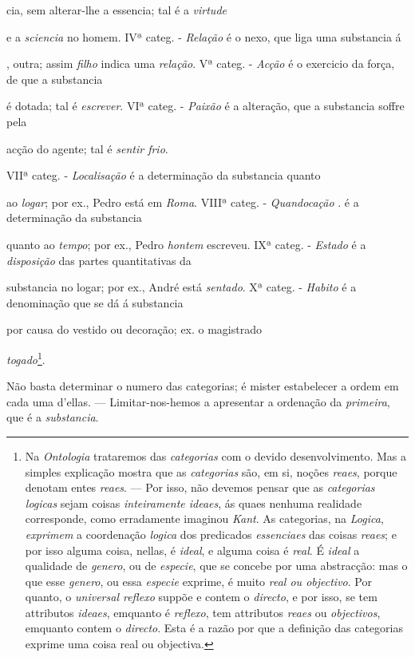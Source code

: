 cia, sem alterar-lhe a essencia; tal é a \emph{virtude}

e a \emph{sciencia} no homem. IVª categ. - \emph{Relação} é o nexo, que liga uma substancia á

, outra; assim \emph{filho} indica uma \emph{relação}. Vª categ. - \emph{Acção} é o exercicio da força, de que a substancia

é dotada; tal é \emph{escrever}. VIª categ. - \emph{Paixão} é a alteração, que a substancia soffre pela

acção do agente; tal é \emph{sentir frio}.

VIIª categ. - \emph{Localisação} é a determinação da substancia quanto

ao \emph{logar}; por ex., Pedro está em \emph{Roma}. VIIIª categ. - \emph{Quandocação} . é a determinação da substancia

quanto ao \emph{tempo}; por ex., Pedro \emph{hontem} escreveu. IXª categ. - \emph{Estado} é a \emph{disposição} das partes quantitativas da

substancia no logar; por ex., André está \emph{sentado}. Xª categ. - \emph{Habito} é a denominação que se dá á substancia

por causa do vestido ou decoração; ex. o magistrado

\emph{togado}\footnote{Na \emph{Ontologia} trataremos das \emph{categorias} com o devido desenvolvimento. Mas a simples explicação mostra que as \emph{categorias} são, em si, noções \emph{reaes}, porque denotam entes \emph{reaes}. --- Por isso, não devemos pensar que as \emph{categorias logicas} sejam coisas \emph{inteiramente ideaes}, ás quaes nenhuma realidade corresponde, como erradamente imaginou \emph{Kant}. As categorias, na \emph{Logica}, \emph{exprimem} a coordenação \emph{logica} dos predicados \emph{essenciaes} das coisas \emph{reaes}; e por isso alguma coisa, nellas, é \emph{ideal}, e alguma coisa é \emph{real}. É \emph{ideal} a qualidade de \emph{genero}, ou de \emph{especie}, que se concebe por uma abstracção: mas o que esse \emph{genero}, ou essa \emph{especie} exprime, é muito \emph{real ou objectivo}. Por quanto, o \emph{universal reflexo} suppõe e contem o \emph{directo}, e por isso, se tem attributos \emph{ideaes}, emquanto é \emph{reflexo}, tem attributos \emph{reaes} ou \emph{objectivos}, emquanto contem o \emph{directo}. Esta é a razão por que a definição das categorias exprime uma coisa real ou objectiva.}.


 
Não basta determinar o numero das categorias; é mister estabelecer a ordem em cada uma d'ellas. --- Limitar-nos-hemos a apresentar a ordenação da \emph{primeira}, que é a \emph{substancia}.

